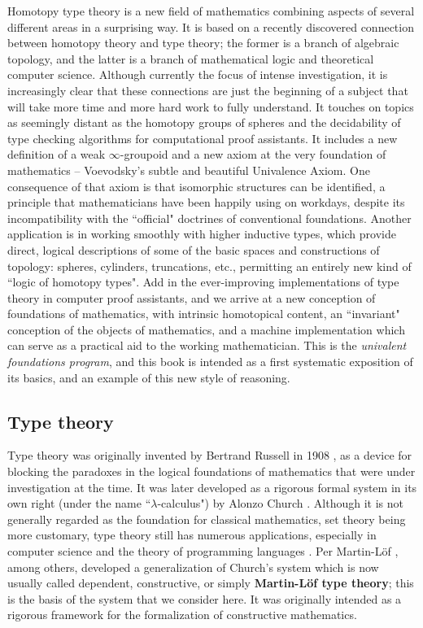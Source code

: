 {Homotopy type theory is a new field of mathematics combining aspects of several different areas in a surprising way.  It is based on a recently discovered connection between homotopy theory and type theory; the former is a branch of algebraic topology, and the latter is a branch of mathematical logic and theoretical computer science.  Although currently the focus of intense investigation, it is increasingly clear that these connections are just the beginning of a subject that will take more time and more hard work to fully understand.  It touches on topics as seemingly distant as the homotopy groups of  spheres and the decidability of type checking algorithms for computational proof assistants.  It includes a new definition of a weak $\infty$-groupoid and a new axiom at the very foundation of mathematics -- Voevodsky's subtle and beautiful Univalence Axiom.  One consequence of that axiom is that isomorphic structures can be identified, a principle that mathematicians have been happily using on workdays, despite its incompatibility with the ``official" doctrines of conventional foundations.  Another application is in working smoothly with higher inductive types, which provide direct, logical descriptions of some of the basic spaces and constructions of topology: spheres, cylinders, truncations, etc., permitting an entirely new kind of ``logic of homotopy types".   Add in the ever-improving  implementations of type theory in computer proof assistants, and we arrive at a new conception of foundations of mathematics, with intrinsic homotopical content, an ``invariant" conception of the objects of mathematics, and a machine implementation which can serve as a practical aid to the working mathematician.  This is the \emph{univalent foundations program}, and this book is intended as a first systematic exposition of its basics, and an example of this new style of reasoning. 


\subsection*{Type theory}

Type theory was originally invented by Bertrand Russell in 1908 \cite{Russell:1908}, as a device for blocking the paradoxes in the logical foundations of mathematics  that were under investigation at the time. It was later developed as a rigorous formal system  in its own right (under the name ``$\lambda$-calculus") by Alonzo Church \cite{Church:1933cl,Church:1940tu,Church:1941tc}.  Although it is not generally regarded as the foundation for classical mathematics, set theory being more customary, type theory still has numerous applications, especially in computer science and the theory of programming languages \cite{Pierce:2002tp}.   Per Martin-L\"{o}f \cite{MartinLof:1998tw,MartinLof:1975tb,MartinLof:1982bn,MartinLof:1984tr}, among others,
developed a generalization of Church's system which is now usually called dependent, constructive, or simply {\bf Martin\--L\"of type theory}; this is the basis of the system that we consider here. It was originally intended as a rigorous framework for the formalization of constructive mathematics.  

}

